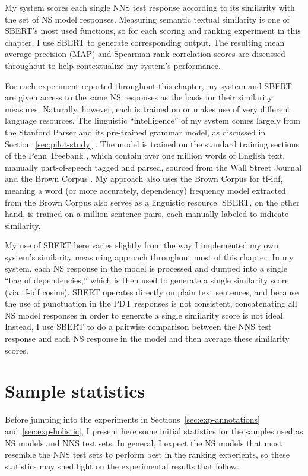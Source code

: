 My system scores each single NNS test response according to its similarity with the set of NS model responses. Measuring semantic textual similarity is one of SBERT's most used functions, so for each scoring and ranking experiment in this chapter, I use SBERT to generate corresponding output. The resulting mean average precision (MAP) and Spearman rank correlation scores are discussed throughout to help contextualize my system's performance.

For each experiment reported throughout this chapter, my system and SBERT are given access to the same NS responses as the basis for their similarity measures. Naturally, however, each is trained on or makes use of very different language resources. The linguistic ``intelligence'' of my system comes largely from the Stanford Parser and its pre-trained grammar model, as discussed in Section~\ref{sec:pilot-study} \cite{klein:manning:03}. The model is trained on the standard training sections of the Penn Treebank \cite{marcus-et-al:93}, which contain over one million words of English text, manually part-of-speech tagged and parsed, sourced from the Wall Street Journal and the Brown Corpus  \cite{kucera:francis:67}. My approach also uses the Brown Corpus for tf-idf, meaning a word (or more accurately, dependency) frequency model extracted from the Brown Corpus also serves as a linguistic resource. SBERT, on the other hand, is trained on a million sentence pairs, each manually labeled to indicate similarity.

My use of SBERT here varies slightly from the way I implemented my own system's similarity measuring approach throughout most of this chapter. In my system, each NS response in the model is processed and dumped into a single ``bag of dependencies,'' which is then used to generate a single similarity score (via tf-idf cosine). SBERT operates directly on plain text sentences, and because the use of punctuation in the PDT responses is not consistent, concatenating all NS model responses in order to generate a single similarity score is not ideal. Instead, I use SBERT to do a pairwise comparison between the NNS test response and each NS response in the model and then average these similarity scores.


\section{Sample statistics}
\label{sec:sample-stats}
Before jumping into the experiments in Sections~\ref{sec:exp-annotations} and~\ref{sec:exp-holistic}, I present here some initial statistics for the samples used as NS models and NNS test sets. In general, I expect the NS models that most resemble the NNS test sets to perform best in the ranking experients, so these statistics may shed light on the experimental results that follow.

